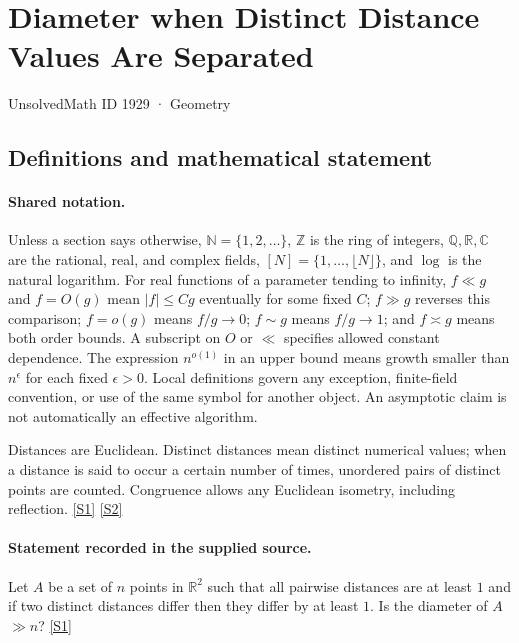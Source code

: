 \documentclass[11pt,a4paper]{article}
\newcommand{\N}{\mathbb{N}}
\newcommand{\Z}{\mathbb{Z}}
\newcommand{\Q}{\mathbb{Q}}
\newcommand{\R}{\mathbb{R}}
\newcommand{\C}{\mathbb{C}}
\newcommand{\sref}[2]{\hyperlink{source:#1:#2}{[S#2]}}
\begin{document}

\setcounter{section}{1928}

\section{Diameter when Distinct Distance Values Are Separated}\label{1929}

{\small\sffamily UnsolvedMath ID 1929 · Geometry}

\subsection{Definitions and mathematical statement}

\paragraph{Shared notation.}Unless a section says otherwise, $\N=\{1,2,\ldots\}$,
$\Z$ is the ring of integers, $\Q,\R,\C$ are the rational, real, and complex
fields, $[N]=\{1,\ldots,\lfloor N\rfloor\}$, and $\log$ is the natural
logarithm. For real functions of a parameter tending to infinity,
$f\ll g$ and $f=O(g)$ mean $|f|\leq Cg$ eventually for some fixed $C$;
$f\gg g$ reverses this comparison; $f=o(g)$ means $f/g\to0$;
$f\sim g$ means $f/g\to1$; and $f\asymp g$ means both order bounds.
A subscript on $O$ or $\ll$ specifies allowed constant dependence.
The expression $n^{o(1)}$ in an upper bound means growth smaller than
$n^\epsilon$ for each fixed $\epsilon>0$. Local definitions govern any
exception, finite-field convention, or use of the same symbol for another
object. An asymptotic claim is not automatically an effective algorithm.



Distances are Euclidean. Distinct distances mean distinct numerical values; when a distance is said to occur a certain number of times, unordered pairs of distinct points are counted. Congruence allows any Euclidean isometry, including reflection. \sref{1929}{1} \sref{1929}{2}

\paragraph{Statement recorded in the supplied source.}
Let $A$ be a set of $n$ points in $\mathbb{R}^2$ such that all pairwise distances are at least $1$ and if two distinct distances differ then they differ by at least $1$. Is the diameter of $A$ $\gg n$? \sref{1929}{1}
\end{document}
